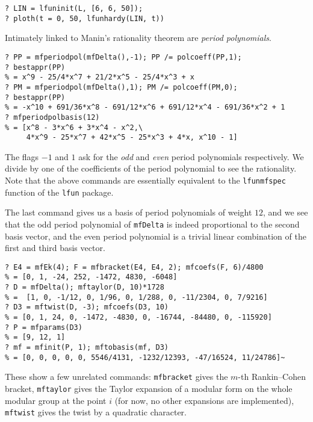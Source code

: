 \documentclass[11pt]{article}
\def\kbd#1{{\tt #1}}
\begin{document}
\begin{verbatim}
? LIN = lfuninit(L, [6, 6, 50]);
? ploth(t = 0, 50, lfunhardy(LIN, t))
\end{verbatim}


\medskip

Intimately linked to Manin's rationality theorem are \emph{period polynomials}.

\begin{verbatim}
? PP = mfperiodpol(mfDelta(),-1); PP /= polcoeff(PP,1);
? bestappr(PP)
% = x^9 - 25/4*x^7 + 21/2*x^5 - 25/4*x^3 + x
? PM = mfperiodpol(mfDelta(),1); PM /= polcoeff(PM,0);
? bestappr(PP)
% = -x^10 + 691/36*x^8 - 691/12*x^6 + 691/12*x^4 - 691/36*x^2 + 1
? mfperiodpolbasis(12)
% = [x^8 - 3*x^6 + 3*x^4 - x^2,\
     4*x^9 - 25*x^7 + 42*x^5 - 25*x^3 + 4*x, x^10 - 1]
\end{verbatim}

The flags $-1$ and $1$ ask for the \emph{odd} and \emph{even} period
polynomials respectively. We divide by one of the coefficients of the
period polynomial to see the rationality. Note that the above commands
are essentially equivalent to the \kbd{lfunmfspec} function of the
\kbd{lfun} package.

The last command gives us a basis of period polynomials of weight $12$, and
we see that the odd period polynomial of \kbd{mfDelta} is indeed proportional
to the second basis vector, and the even period polynomial is a trivial
linear combination of the first and third basis vector.

\medskip

\begin{verbatim}
? E4 = mfEk(4); F = mfbracket(E4, E4, 2); mfcoefs(F, 6)/4800
% = [0, 1, -24, 252, -1472, 4830, -6048]
? D = mfDelta(); mftaylor(D, 10)*1728
% =  [1, 0, -1/12, 0, 1/96, 0, 1/288, 0, -11/2304, 0, 7/9216]
? D3 = mftwist(D, -3); mfcoefs(D3, 10)
% = [0, 1, 24, 0, -1472, -4830, 0, -16744, -84480, 0, -115920]
? P = mfparams(D3)
% = [9, 12, 1]
? mf = mfinit(P, 1); mftobasis(mf, D3)
% = [0, 0, 0, 0, 0, 5546/4131, -1232/12393, -47/16524, 11/24786]~
\end{verbatim}

These show a few unrelated commands: \kbd{mfbracket} gives the $m$-th
Rankin--Cohen bracket, \kbd{mftaylor} gives the Taylor expansion of
a modular form on the whole modular group at the point $i$ (for now,
no other expansions are implemented), \kbd{mftwist} gives the twist
by a quadratic character.
\end{document}
